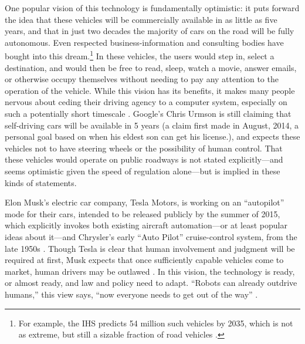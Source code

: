 One popular vision of this technology is fundamentally optimistic: it
puts forward the
idea that these vehicles will be commercially available in as little
as five years, and that in just two decades the majority of cars on the road will be
fully autonomous. Even respected business-information and consulting
bodies have bought into this dream.\footnote{For example, the IHS
  predicts 54 million such vehicles by 2035, which is not as extreme,
  but still a sizable fraction of road vehicles \cite{IHSstudy}.} In
these vehicles, the users would 
step in, select a destination, and would then be free to read, sleep,
watch a movie, answer emails, or otherwise occupy themselves without
needing to pay any attention to the operation of the vehicle. While this
vision has its benefits, it makes many people nervous about
ceding their driving agency to a computer system, especially on such a
potentially short timescale \cite{clytton}. Google's Chris Urmson is
still claiming that self-driving cars will be available in 5 years (a
claim first made in August, 2014, a personal goal based on when his
eldest son can get his license\cite{gomesObstacles}.), and expects
these vehicles not to have steering wheels or the possibility of human
control. That these vehicles would operate on public roadways is not
stated explicitly---and seems optimistic given the speed of regulation
alone---but is implied in these kinds of statements. 


Elon Musk's electric car company, Tesla Motors, is working on an
``autopilot'' mode for their cars, intended to be released publicly by
the summer of 2015, 
which explicitly invokes both existing aircraft automation---or at
least popular ideas about it---and Chrysler's early ``Auto Pilot''
cruise-control system, from the late 1950s
\cite{kesslerElon}.
Though Tesla is clear that human involvement and judgment will be
required at first, Musk expects
that once sufficiently capable vehicles 
come to market, human drivers may be
outlawed \cite{kingGoogle}.
In this vision, the technology is ready, or almost ready, and law and policy need to
adapt. ``Robots can already outdrive humans,'' this view says, ``now
everyone needs to get out of the way''
\cite{fisherInside}.


